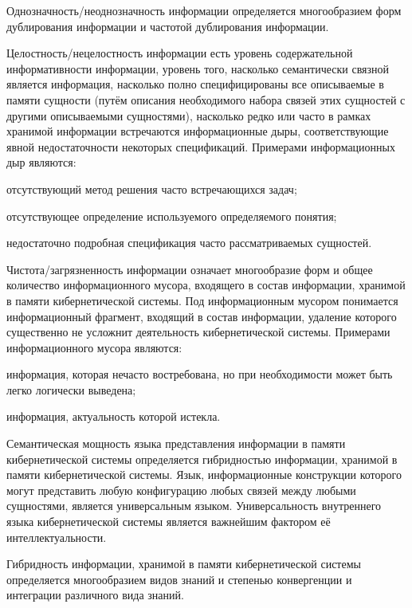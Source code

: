Однозначность/неоднозначность информации определяется многообразием форм дублирования информации и частотой дублирования информации.

Целостность/нецелостность информации есть уровень содержательной информативности информации, уровень того, насколько семантически связной является информация, насколько полно специфицированы все описываемые в памяти сущности (путём описания необходимого набора связей этих сущностей с другими описываемыми сущностями), насколько редко или часто в рамках хранимой информации встречаются информационные дыры, соответствующие явной недостаточности некоторых спецификаций. 
Примерами информационных дыр являются:
\begin{textitemize}
    \item отсутствующий метод решения часто встречающихся задач;
    \item отсутствующее определение используемого определяемого понятия;
    \item недостаточно подробная спецификация часто рассматриваемых сущностей.
\end{textitemize}

Чистота/загрязненность информации означает многообразие форм и общее количество информационного мусора, входящего в состав информации, хранимой в памяти кибернетической системы.
Под информационным мусором понимается информационный фрагмент, входящий в состав информации, удаление которого существенно не усложнит деятельность кибернетической системы.
Примерами информационного мусора являются:
\begin{textitemize}
    \item информация, которая нечасто востребована, но при необходимости может быть легко логически выведена;
    \item информация, актуальность которой истекла.
\end{textitemize}

Семантическая мощность языка представления информации в памяти кибернетической системы определяется гибридностью информации, хранимой в памяти кибернетической системы.
Язык, информационные конструкции которого могут представить любую конфигурацию любых связей между любыми сущностями, является универсальным языком.
Универсальность внутреннего языка кибернетической системы является важнейшим фактором её интеллектуальности.

Гибридность информации, хранимой в памяти кибернетической системы определяется многообразием видов знаний и степенью конвергенции и интеграции различного вида знаний.

